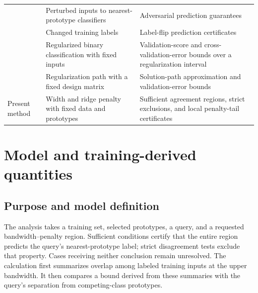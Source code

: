 \documentclass[preprint,12pt,authoryear]{elsarticle}
\begin{document}
\begin{table}[!htbp]
\begin{tabularx}{\textwidth}{@{}>{\raggedright\arraybackslash}p{}>{\raggedright\arraybackslash}X>{\raggedright\arraybackslash}X@{}}
\citet{voracek2022} & Perturbed inputs to nearest-prototype classifiers & Adversarial prediction guarantees \\
\citet{rosenfeld2020} & Changed training labels & Label-flip prediction certificates \\
\citet{shibagaki2015} & Regularized binary classification with fixed inputs & Validation-score and cross-validation-error bounds over a regularization interval \\
\citet{ndiaye2019} & Regularization path with a fixed design matrix & Solution-path approximation and validation-error bounds \\
Present method & Width and ridge penalty with fixed data and prototypes & Sufficient agreement regions, strict exclusions, and local penalty-tail certificates \\
\bottomrule
\end{tabularx}
\end{table}

\section{Model and training-derived quantities}
\subsection{Purpose and model definition}
The analysis takes a training set, selected prototypes, a query, and a requested bandwidth--penalty region. Sufficient conditions certify that the entire region predicts the query's nearest-prototype label; strict disagreement tests exclude that property. Cases receiving neither conclusion remain unresolved. The calculation first summarizes overlap among labeled training inputs at the upper bandwidth. It then compares a bound derived from these summaries with the query's separation from competing-class prototypes.
\end{document}
